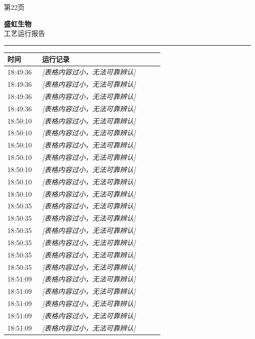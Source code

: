 \documentclass[UTF8,10pt,a4paper,fontset=fandol]{ctexart}
\begin{document}
\begin{center}
\begin{minipage}[t]{0.47\linewidth}
\vspace{2pt}
第22页
\end{minipage}

\vspace{12pt}

\begin{minipage}[t]{0.47\linewidth}
\centering
\textbf{盛虹生物}\\[2pt]
工艺运行报告\\[-1pt]
\textcolor{yellow}{\rule{\linewidth}{0.6pt}}

\begin{tabular}{|p{0.20\linewidth}|p{0.70\linewidth}|}
\hline
时间 & 运行记录 \\ \hline
18:49:36 & \textit{[表格内容过小，无法可靠辨认]} \\ \hline
18:49:36 & \textit{[表格内容过小，无法可靠辨认]} \\ \hline
18:49:36 & \textit{[表格内容过小，无法可靠辨认]} \\ \hline
18:49:36 & \textit{[表格内容过小，无法可靠辨认]} \\ \hline
18:50:10 & \textit{[表格内容过小，无法可靠辨认]} \\ \hline
18:50:10 & \textit{[表格内容过小，无法可靠辨认]} \\ \hline
18:50:10 & \textit{[表格内容过小，无法可靠辨认]} \\ \hline
18:50:10 & \textit{[表格内容过小，无法可靠辨认]} \\ \hline
18:50:10 & \textit{[表格内容过小，无法可靠辨认]} \\ \hline
18:50:10 & \textit{[表格内容过小，无法可靠辨认]} \\ \hline
18:50:10 & \textit{[表格内容过小，无法可靠辨认]} \\ \hline
18:50:35 & \textit{[表格内容过小，无法可靠辨认]} \\ \hline
18:50:35 & \textit{[表格内容过小，无法可靠辨认]} \\ \hline
18:50:35 & \textit{[表格内容过小，无法可靠辨认]} \\ \hline
18:50:35 & \textit{[表格内容过小，无法可靠辨认]} \\ \hline
18:50:35 & \textit{[表格内容过小，无法可靠辨认]} \\ \hline
18:50:35 & \textit{[表格内容过小，无法可靠辨认]} \\ \hline
18:51:09 & \textit{[表格内容过小，无法可靠辨认]} \\ \hline
18:51:09 & \textit{[表格内容过小，无法可靠辨认]} \\ \hline
18:51:09 & \textit{[表格内容过小，无法可靠辨认]} \\ \hline
18:51:09 & \textit{[表格内容过小，无法可靠辨认]} \\ \hline
18:51:09 & \textit{[表格内容过小，无法可靠辨认]} \\ \hline
\end{tabular}


\end{minipage}
\end{center}
\end{document}
